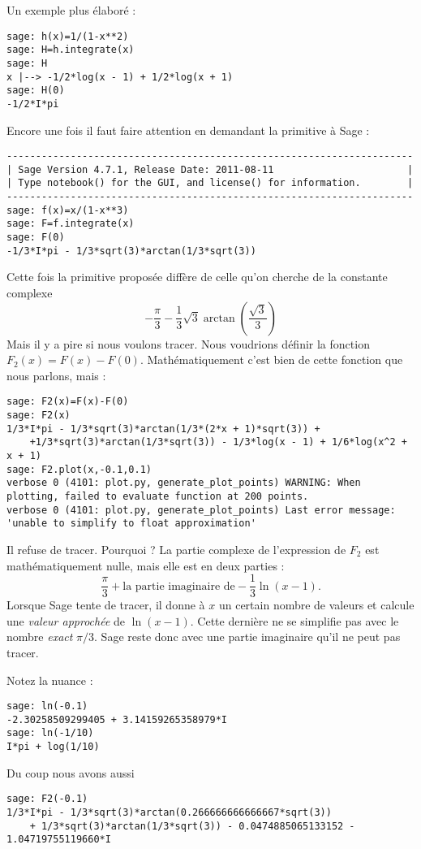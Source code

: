 Un exemple plus élaboré :
\begin{verbatim}
sage: h(x)=1/(1-x**2)
sage: H=h.integrate(x)
sage: H
x |--> -1/2*log(x - 1) + 1/2*log(x + 1)
sage: H(0)
-1/2*I*pi
\end{verbatim}
    



\begin{example}
Encore une fois il faut faire attention en demandant la primitive à Sage :
\begin{verbatim}
----------------------------------------------------------------------
| Sage Version 4.7.1, Release Date: 2011-08-11                       |
| Type notebook() for the GUI, and license() for information.        |
----------------------------------------------------------------------
sage: f(x)=x/(1-x**3)
sage: F=f.integrate(x)
sage: F(0)
-1/3*I*pi - 1/3*sqrt(3)*arctan(1/3*sqrt(3))
\end{verbatim}
Cette fois la primitive proposée diffère de celle qu'on cherche de la constante complexe
\begin{equation}
    -\frac{ \pi }{ 3 }-\frac{1}{ 3 }\sqrt{3}\arctan(\frac{ \sqrt{3} }{ 3 })
\end{equation}
Mais il y a pire si nous voulons tracer. Nous voudrions définir la fonction \( F_2(x)=F(x)-F(0)\). Mathématiquement c'est bien de cette fonction que nous parlons, mais :
\begin{verbatim}
sage: F2(x)=F(x)-F(0)
sage: F2(x)
1/3*I*pi - 1/3*sqrt(3)*arctan(1/3*(2*x + 1)*sqrt(3)) + 
    +1/3*sqrt(3)*arctan(1/3*sqrt(3)) - 1/3*log(x - 1) + 1/6*log(x^2 + x + 1)
sage: F2.plot(x,-0.1,0.1)
verbose 0 (4101: plot.py, generate_plot_points) WARNING: When plotting, failed to evaluate function at 200 points.
verbose 0 (4101: plot.py, generate_plot_points) Last error message: 'unable to simplify to float approximation'
\end{verbatim}
Il refuse de tracer. Pourquoi ? La partie complexe de l'expression de \( F_2\) est mathématiquement nulle, mais elle est en deux parties :
\begin{equation}
    \frac{ \pi }{ 3 }+\text{la partie imaginaire de} -\frac{1}{ 3 }\ln(x-1).
\end{equation}
Lorsque Sage tente de tracer, il donne à \( x\) un certain nombre de valeurs et calcule une \emph{valeur approchée} de \( \ln(x-1)\). Cette dernière ne se simplifie pas avec le nombre \emph{exact} \( \pi/3\). Sage reste donc avec une partie imaginaire qu'il ne peut pas tracer.

Notez la nuance :
\begin{verbatim}
sage: ln(-0.1)
-2.30258509299405 + 3.14159265358979*I
sage: ln(-1/10)
I*pi + log(1/10)
\end{verbatim}
Du coup nous avons aussi
\begin{verbatim}
sage: F2(-0.1)
1/3*I*pi - 1/3*sqrt(3)*arctan(0.266666666666667*sqrt(3)) 
    + 1/3*sqrt(3)*arctan(1/3*sqrt(3)) - 0.0474885065133152 - 1.04719755119660*I
\end{verbatim}

    
\end{example}

